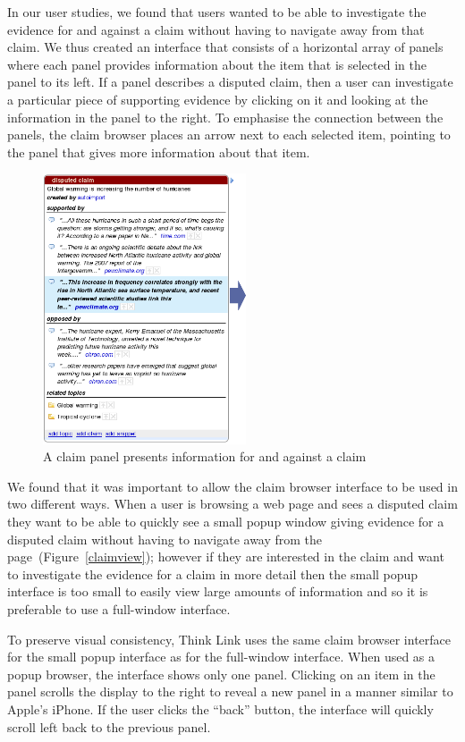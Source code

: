 \documentclass{chi2009}
\begin{document}
In our user studies, we found that users wanted to be able to investigate the evidence for and against a claim without having to navigate away from that claim. We thus created an interface that consists of a horizontal array of panels where each panel provides information about the item that is selected in the panel to its left. If a panel describes a disputed claim, then a user can investigate a particular piece of supporting evidence by clicking on it and looking at the information in the panel to the right. To emphasise the connection between the panels, the claim browser places an arrow next to each selected item, pointing to the panel that gives more information about that item.

\begin{figure}[tb]
	\begin{center}
	\includegraphics[width=6cm]{../screenshots/v2_panel.png}
	\caption{A claim panel presents information for and against a claim}
	\label{panel}
	\end{center}
\end{figure}


We found that it was important to allow the claim browser interface to be used in two different ways. When a user is browsing a web page and sees a disputed claim they want to be able to quickly see a small popup window giving evidence for a disputed claim without having to navigate away from the page~(Figure~\ref{claimview}); however if they are interested in the claim and want to investigate the evidence for a claim in more detail then the small popup interface is too small to easily view large amounts of information and so it is preferable to use a full-window interface. 

To preserve visual consistency, Think Link uses the same claim browser interface for the small popup interface as for the full-window interface. When used as a popup browser, the interface shows only one panel. Clicking on an item in the panel scrolls the display to the right to reveal a new panel in a manner similar to Apple's iPhone. If the user clicks the ``back'' button, the interface will quickly scroll left back to the previous panel.
\end{document}
